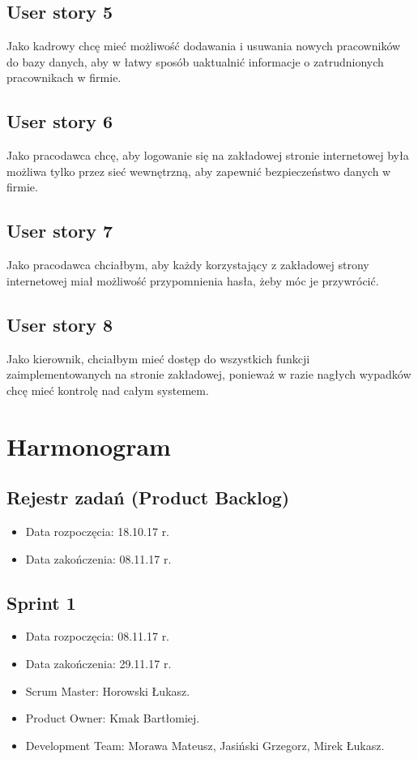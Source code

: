 \documentclass[a4paper]{article}
\begin{document}
\subsection{User story 5}
Jako kadrowy chcę mieć możliwość dodawania i usuwania nowych pracowników do bazy danych, aby w łatwy sposób uaktualnić informacje o zatrudnionych pracownikach w firmie. 

\subsection{User story 6}
Jako pracodawca chcę, aby logowanie się na zakładowej stronie internetowej była możliwa tylko przez sieć wewnętrzną, aby zapewnić bezpieczeństwo danych w firmie.

\subsection{User story 7}
Jako pracodawca chciałbym, aby każdy korzystający z zakładowej strony internetowej miał możliwość przypomnienia hasła, żeby móc je przywrócić.

\subsection{User story 8}
Jako kierownik, chciałbym mieć dostęp do wszystkich funkcji zaimplementowanych na stronie zakładowej, ponieważ w razie nagłych wypadków chcę mieć kontrolę nad całym systemem.


\section{Harmonogram}

\subsection{Rejestr zadań (Product Backlog)}

\begin{itemize}
\item Data rozpoczęcia: 18.10.17 r.
\item Data zakończenia: 08.11.17 r.
\end{itemize}

\subsection{Sprint 1}

\begin{itemize}
\item Data rozpoczęcia: 08.11.17 r.
\item Data zakończenia: 29.11.17 r.
\item Scrum Master: Horowski Łukasz.
\item Product Owner: Kmak Bartłomiej.
\item Development Team: Morawa Mateusz, Jasiński Grzegorz, Mirek Łukasz.
\end{itemize}
\end{document}
